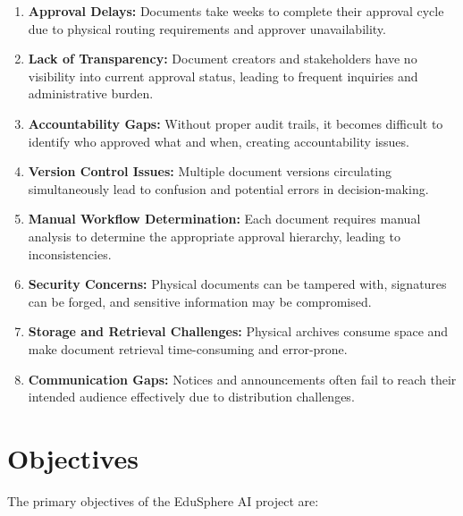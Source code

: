 \begin{enumerate}[itemsep=5pt]
\item \textbf{Approval Delays:} Documents take weeks to complete their approval cycle due to physical routing requirements and approver unavailability.

\item \textbf{Lack of Transparency:} Document creators and stakeholders have no visibility into current approval status, leading to frequent inquiries and administrative burden.

\item \textbf{Accountability Gaps:} Without proper audit trails, it becomes difficult to identify who approved what and when, creating accountability issues.

\item \textbf{Version Control Issues:} Multiple document versions circulating simultaneously lead to confusion and potential errors in decision-making.

\item \textbf{Manual Workflow Determination:} Each document requires manual analysis to determine the appropriate approval hierarchy, leading to inconsistencies.

\item \textbf{Security Concerns:} Physical documents can be tampered with, signatures can be forged, and sensitive information may be compromised.

\item \textbf{Storage and Retrieval Challenges:} Physical archives consume space and make document retrieval time-consuming and error-prone.

\item \textbf{Communication Gaps:} Notices and announcements often fail to reach their intended audience effectively due to distribution challenges.
\end{enumerate}

\section{Objectives}

The primary objectives of the EduSphere AI project are:

